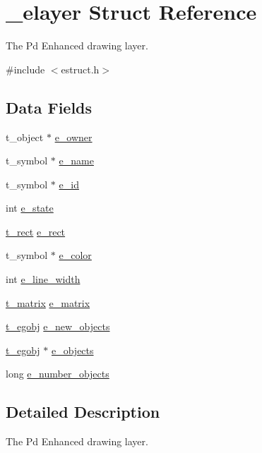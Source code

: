 \hypertarget{struct__elayer}{\section{\-\_\-elayer Struct Reference}
\label{struct__elayer}
}


The Pd Enhanced drawing layer.  




{\ttfamily \#include $<$estruct.\-h$>$}

\subsection*{Data Fields}
\begin{DoxyCompactItemize}
\item 
t\-\_\-object $\ast$ \hyperlink{struct__elayer_a2a35e154dc0053b0c8078d322ee1b5e3}{e\-\_\-owner}
\item 
t\-\_\-symbol $\ast$ \hyperlink{struct__elayer_a6d8c2140844c7949fe9bc0384b2129d8}{e\-\_\-name}
\item 
t\-\_\-symbol $\ast$ \hyperlink{struct__elayer_a1f5d3d53b83fa9009ede11f8a9902dff}{e\-\_\-id}
\item 
int \hyperlink{struct__elayer_a6ebb09ffbaedff41ff95d74f7ebdb71b}{e\-\_\-state}
\item 
\hyperlink{struct__rect}{t\-\_\-rect} \hyperlink{struct__elayer_aaef55281ce06e8d04077acd1e73e484e}{e\-\_\-rect}
\item 
t\-\_\-symbol $\ast$ \hyperlink{struct__elayer_a13dfb00aea95e0dc5b9d1297260a9280}{e\-\_\-color}
\item 
int \hyperlink{struct__elayer_a4f088d61988de49543e814d4b5a74947}{e\-\_\-line\-\_\-width}
\item 
\hyperlink{struct__matrix}{t\-\_\-matrix} \hyperlink{struct__elayer_a62d53e14693deed3469c69dc3a857493}{e\-\_\-matrix}
\item 
\hyperlink{struct__egobj}{t\-\_\-egobj} \hyperlink{struct__elayer_a793a735e42cff87ab0df8772c76fe039}{e\-\_\-new\-\_\-objects}
\item 
\hyperlink{struct__egobj}{t\-\_\-egobj} $\ast$ \hyperlink{struct__elayer_a6f0b120b9e9be17af36ba96a368ffccb}{e\-\_\-objects}
\item 
long \hyperlink{struct__elayer_ad5b10c31f81ecf9116b72b70b25f9e79}{e\-\_\-number\-\_\-objects}
\end{DoxyCompactItemize}


\subsection{Detailed Description}
The Pd Enhanced drawing layer. 

